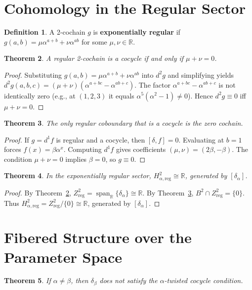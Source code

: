 \documentclass[11pt,a4paper]{article}
\theoremstyle{plain}
\newtheorem{theorem}{Theorem}[section]
\theoremstyle{definition}
\newtheorem{definition}[theorem]{Definition}
\theoremstyle{remark}
\newcommand{\RR}{\mathbb{R}}
\begin{document}
	\section{Cohomology in the Regular Sector}
	\label{sec:H2}
	\begin{definition}
		A 2-cochain $g$ is \textbf{exponentially regular} if $g(a,b)=\mu\alpha^{a+b}+\nu\alpha^{ab}$ for some $\mu,\nu\in\RR$.
	\end{definition}
	
	\begin{theorem}
		\label{thm:regular-cocycles}
		A regular 2-cochain is a cocycle if and only if $\mu+\nu=0$.
	\end{theorem}
	
	\begin{proof}
		Substituting $g(a,b)=\mu\alpha^{a+b}+\nu\alpha^{ab}$ into $d^2g$ and simplifying yields $d^2g(a,b,c)=(\mu+\nu)(\alpha^{a+bc}-\alpha^{ab+c})$. The factor $\alpha^{a+bc}-\alpha^{ab+c}$ is not identically zero (e.g., at $(1,2,3)$ it equals $\alpha^5(\alpha^2-1)\neq 0$). Hence $d^2g\equiv 0$ iff $\mu+\nu=0$.
	\end{proof}
	
	\begin{theorem}
		\label{thm:B2-cap-Z2}
		The only regular coboundary that is a cocycle is the zero cochain.
	\end{theorem}
	
	\begin{proof}
		If $g=d^1f$ is regular and a cocycle, then $[\delta,f]=0$. Evaluating at $b=1$ forces $f(x)=\beta\alpha^x$. Computing $d^1f$ gives coefficients $(\mu,\nu)=(2\beta,-\beta)$. The condition $\mu+\nu=0$ implies $\beta=0$, so $g\equiv 0$.
	\end{proof}
	
	\begin{theorem}
		\label{thm:H2}
		In the exponentially regular sector, $H^2_{\alpha,\mathrm{reg}}\cong\RR$, generated by $[\delta_\alpha]$.
	\end{theorem}
	
	\begin{proof}
		By Theorem~\ref{thm:regular-cocycles}, $Z^2_{\mathrm{reg}}=\operatorname{span}_\RR\{\delta_\alpha\}\cong\RR$. By Theorem~\ref{thm:B2-cap-Z2}, $B^2\cap Z^2_{\mathrm{reg}}=\{0\}$. Thus $H^2_{\alpha,\mathrm{reg}}=Z^2_{\mathrm{reg}}/\{0\}\cong\RR$, generated by $[\delta_\alpha]$.
	\end{proof}
	
	\section{Fibered Structure over the Parameter Space}
	\label{sec:fibered}
	\begin{theorem}
		\label{thm:fibered}
		If $\alpha \neq \beta$, then $\delta_\beta$ does not satisfy the $\alpha$-twisted cocycle condition.
	\end{theorem}
	
\end{document}
